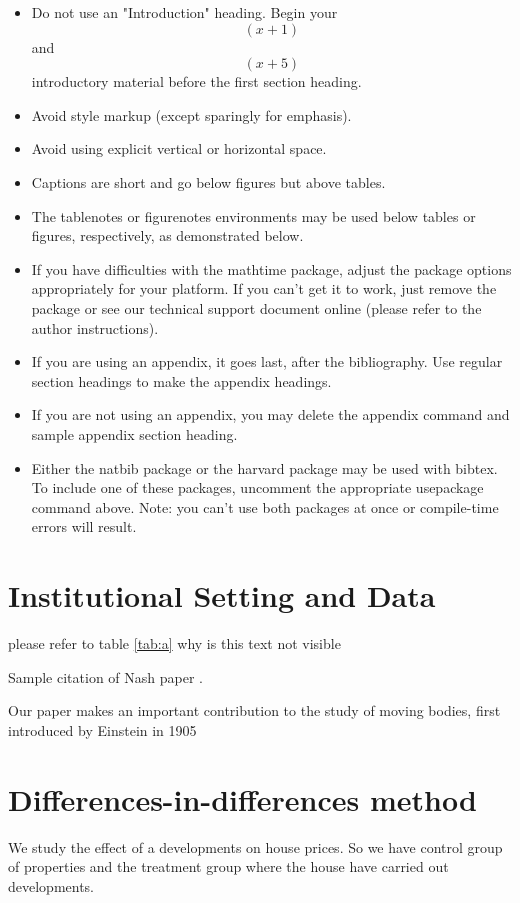 \documentclass[AEJ]{AEA}
\begin{document}
\begin{itemize}
\item Do not use an "Introduction" heading. Begin your $$(x+1)$$ and $$(x+5)$$ introductory material before the first section heading.

\item Avoid style markup (except sparingly for emphasis).
\item Avoid using explicit vertical or horizontal space.
\item Captions are short and go below figures but above tables.
\item The tablenotes or figurenotes environments may be used below tables
or figures, respectively, as demonstrated below.
\item If you have difficulties with the mathtime package, adjust the package
options appropriately for your platform. If you can't get it to work, just
remove the package or see our technical support document online (please
refer to the author instructions).
\item If you are using an appendix, it goes last, after the bibliography.
Use regular section headings to make the appendix headings.
\item If you are not using an appendix, you may delete the appendix command
and sample appendix section heading.
\item Either the natbib package or the harvard package may be used with bibtex.
To include one of these packages, uncomment the appropriate usepackage command
above. Note: you can't use both packages at once or compile-time errors will result.

\end{itemize}

\section{Institutional Setting and Data}

please refer to table \ref{tab:a}
why is this text not visible

Sample citation of Nash paper \cite{Nash}.

Our paper makes an important contribution to the study of moving bodies, first introduced by Einstein in 1905 \cite{Einstein05}



\section{Differences-in-differences method}
We study the effect of a developments on house prices. So we have control group of properties and the treatment group where the house have carried out developments. 
\end{document}
